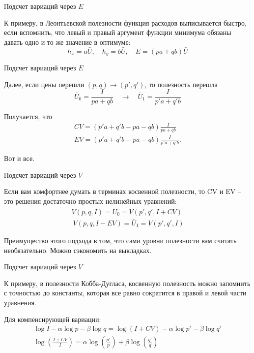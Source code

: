 \documentclass{beamer}
\begin{document}
\begin{frame}{Подсчет вариаций через $E$}

К примеру, в Леонтьевской полезности функция расходов выписывается быстро, если вспомнить, что левый и правый аргумент функции минимума обязаны давать одно и то же значение в оптимуме: 
$$h_x = a \bar U, \quad h_y = b \bar U, \quad E = (pa + qb) \bar U$$
\end{frame}

\begin{frame}{Подсчет вариаций через $E$}

Далее, если цены перешли $(p,q) \to (p',q')$, то полезность перешла 
$$ \bar U_0 = \frac{I}{pa + qb} \quad \to \quad \bar U_1 = \frac{I}{p'a + q'b} $$

Получается, что
\begin{gather*}
CV = (p'a + q' b - pa - qb) \frac{I}{pa + qb}\\
EV = (p'a + q' b - pa - qb) \frac{I}{p' a + q' b}.
\end{gather*}

Вот и все.
\end{frame}

\begin{frame}{Подсчет вариаций через $V$}

Если вам комфортнее думать в терминах косвенной полезности, то CV и EV  – это решения достаточно простых нелинейных уравнений:
\begin{gather*}
V(p,q,I) = \bar U_0 = V(p',q',I+CV)\\\
V(p,q,I-EV) = \bar U_1 = V(p',q',I)
\end{gather*}

Преимущество этого подхода в том, что сами уровни полезности вам считать необязательно. Можно сэкономить на выкладках.

\end{frame}

\begin{frame}{Подсчет вариаций через $V$}

К примеру, в полезности Кобба-Дугласа, косвенную полезность можно запомнить с точностью до константы, которая все равно сократится в правой и левой части уравнения.

Для компенсирующей вариации:
\begin{gather*}
 \log I - \alpha \log p - \beta \log q = \log (I+CV) - \alpha \log p' - \beta \log q'\\
 \log(\frac{I+CV}{I}) = \alpha \log (\frac{p'}{p}) + \beta \log (\frac{q'}{q})
\end{gather*}

\end{frame}
\end{document}
